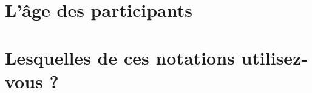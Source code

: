 \documentclass[a4paper,man,hidelinks,floatsintext,x11names]{apa7}
\begin{document}
        
      
    
      
      
    
      
        
      
    
      
      
    
            
\section{L'âge des participants}

           
      
        
      
    
      
      

      
        
      
    
      
      
    
      
      
    
      
        
      
    
      
      
    
            
\section{Lesquelles de ces notations utilisez-vous ?}

           
      
        
      
\end{document}
